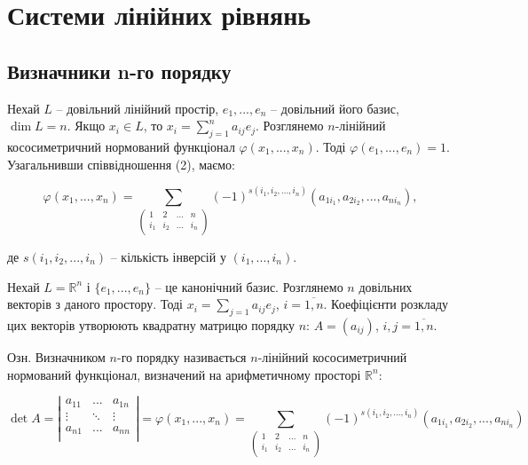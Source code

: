 \section{Системи лінійних рівнянь}


\subsection{Визначники n-го порядку}

Нехай $L$ -- довільний лінійний простір, $e_1, ..., e_n$ -- довільний його базис,
$\dim L = n$. Якщо $x_i \in L$, то $x_i = \sum\limits_{j=1}^n a_{ij} e_j$. Розглянемо
$n$-лінійний кососиметричний нормований функціонал $\varphi(x_1, ..., x_n)$. Тоді $\varphi(e_1, ..., e_n) = 1$.
Узагальнивши співвідношення (2), маємо:

$$\varphi(x_1, ..., x_n) = \sum\limits_{ \begin{pmatrix} 1 & 2 & ... & n \\ i_1 & i_2 & ... & i_n \\ \end{pmatrix} } (-1)^{s(i_1, i_2, ..., i_n)} (a_{1 i_1}, a_{2 i_2}, ..., a_{n i_n}),$$

де $s(i_1, i_2, ..., i_n)$ -- кількість інверсій у $(i_1, ..., i_n)$. 

Нехай $L = \mathbb{R}^n$ і $\{e_1, ..., e_n\}$ -- це канонічний базис. Розглянемо $n$ довільних
векторів з даного простору. Тоді $x_i = \sum\limits_{j=1} a_{ij} e_j$, $i = \overline{1,n}$.
Коефіцієнти розкладу цих векторів утворюють квадратну матрицю порядку $n$: $A = (a_{ij})$, $i,j = \overline{1,n}$.



Озн. Визначником $n$-го порядку називається $n$-лінійний кососиметричний
нормований функціонал, визначений на арифметичному просторі $\mathbb{R}^n$:

$$\det A = \left| \begin{matrix}
	a_{11} & ...    & a_{1n} \\
	\vdots & \ddots & \vdots \\
	a_{n1} & ...    & a_{nn} \\
\end{matrix} \right| = \varphi(x_1, ..., x_n) 
= \sum\limits_{ \begin{pmatrix} 1 & 2 & ... & n \\ i_1 & i_2 & ... & i_n \\ \end{pmatrix} }
	(-1)^{s(i_1, i_2, ..., i_n)} (a_{1 i_1}, a_{2 i_2}, ..., a_{n i_n})$$


